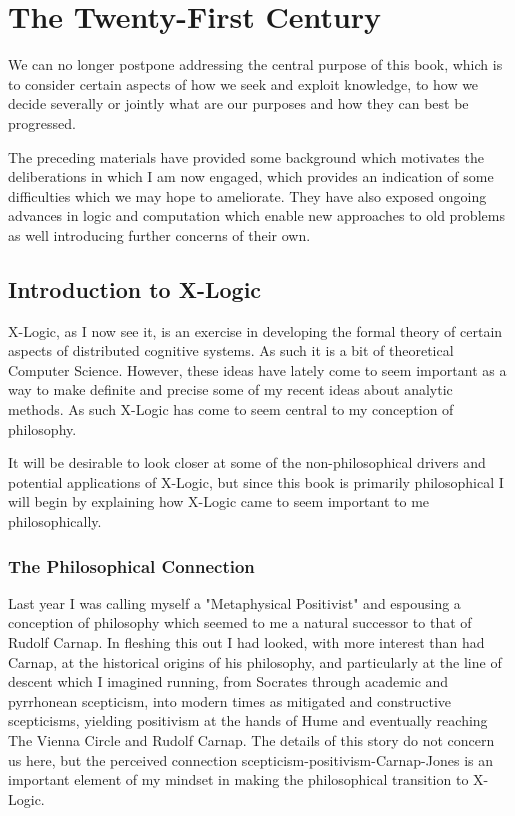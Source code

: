 
\newtheorem{iprin}{I}

\part{The Twenty-First Century}\label{partIV}

We can no longer postpone addressing the central purpose of this book, which is to consider certain aspects of how we seek and exploit knowledge, to how we decide severally or jointly what are our purposes and how they can best be progressed.

The preceding materials have provided some background which motivates the deliberations in which I am now engaged, which provides an indication of some difficulties which we may hope to ameliorate.
They have also exposed ongoing advances in logic and computation which enable new approaches to old problems as well introducing further concerns of their own.

\chapter{Introduction to X-Logic}

X-Logic, as I now see it, is an exercise in developing the formal theory of certain aspects of distributed cognitive systems.
As such it is a bit of theoretical Computer Science.
However, these ideas have lately come to seem important as a way to make definite and precise some of my recent ideas about analytic methods.
As such X-Logic has come to seem central to my conception of philosophy.

It will be desirable to look closer at some of the non-philosophical drivers and potential applications of X-Logic, but since this book is primarily philosophical I will begin by explaining how X-Logic came to seem important to me philosophically.

\section{The Philosophical Connection}

Last year I was calling myself a "Metaphysical Positivist" and espousing a conception of philosophy which seemed to me a natural successor to that of Rudolf Carnap.
In fleshing this out I had looked, with more interest than had Carnap, at the historical origins of his philosophy, and particularly at the line of descent which I imagined running, from Socrates through academic and pyrrhonean scepticism, into modern times as mitigated and constructive scepticisms, yielding positivism at the hands of Hume and eventually reaching The Vienna Circle and Rudolf Carnap.
The details of this story do not concern us here, but the perceived connection scepticism-positivism-Carnap-Jones is an important element of my mindset in making the philosophical transition to X-Logic.

